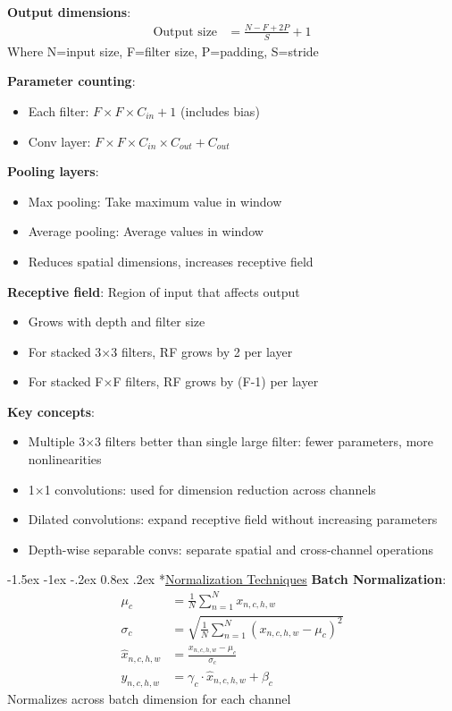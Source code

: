 \documentclass{article}
\makeatletter
\renewcommand\section{\@startsection{section}{1}{\z@}%
                                  {-1.5ex \@plus -1ex \@minus -.2ex}%
                                  {0.8ex \@plus.2ex}%
                                  {\normalfont\small\bfseries}}
\makeatother
\begin{document}
\begin{multicols}{3}
\textbf{Output dimensions}: 
\begin{align*}
\text{Output size} &= \frac{N - F + 2P}{S} + 1
\end{align*}
Where N=input size, F=filter size, P=padding, S=stride

\textbf{Parameter counting}:
\begin{itemize}
\item Each filter: $F \times F \times C_{in} + 1$ (includes bias)
\item Conv layer: $F \times F \times C_{in} \times C_{out} + C_{out}$
\end{itemize}

\textbf{Pooling layers}: 
\begin{itemize}
\item Max pooling: Take maximum value in window
\item Average pooling: Average values in window
\item Reduces spatial dimensions, increases receptive field
\end{itemize}

\textbf{Receptive field}: Region of input that affects output
\begin{itemize}
\item Grows with depth and filter size
\item For stacked 3×3 filters, RF grows by 2 per layer
\item For stacked F×F filters, RF grows by (F-1) per layer
\end{itemize}

\textbf{Key concepts}:
\begin{itemize}
\item Multiple 3×3 filters better than single large filter: fewer parameters, more nonlinearities
\item 1×1 convolutions: used for dimension reduction across channels
\item Dilated convolutions: expand receptive field without increasing parameters
\item Depth-wise separable convs: separate spatial and cross-channel operations
\end{itemize}

\section*{\underline{Normalization Techniques}}
\textbf{Batch Normalization}:
\begin{align*}
\mu_c &= \frac{1}{N} \sum_{n=1}^{N} x_{n,c,h,w}\\
\sigma_c &= \sqrt{\frac{1}{N} \sum_{n=1}^{N} (x_{n,c,h,w} - \mu_c)^2}\\
\hat{x}_{n,c,h,w} &= \frac{x_{n,c,h,w} - \mu_c}{\sigma_c}\\
y_{n,c,h,w} &= \gamma_c \cdot \hat{x}_{n,c,h,w} + \beta_c
\end{align*}
Normalizes across batch dimension for each channel


\end{multicols}
\end{document}
